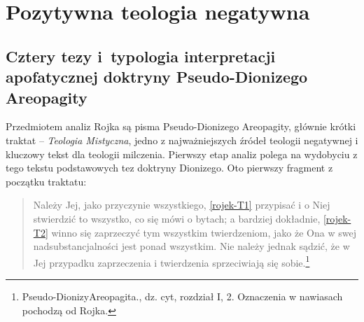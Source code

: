 \chapter{Pozytywna teologia negatywna}


\section{Cztery tezy i~typologia interpretacji apofatycznej doktryny Pseudo-Dionizego Areopagity}

Przedmiotem analiz Rojka są pisma Pseudo-Dionizego Areopagity, głównie
krótki traktat -- \textit{Teologia Mistyczna}, jedno z najważniejszych
źródeł teologii negatywnej i kluczowy tekst dla teologii milczenia.
Pierwszy etap analiz polega na wydobyciu z tego tekstu podstawowych tez
doktryny Dionizego. Oto pierwszy fragment z początku traktatu:

\begin{quote}
    Należy Jej, jako przyczynie wszystkiego, \eqref{rojek-T1} przypisać i o Niej
stwierdzić to wszystko, co się mówi o bytach; a bardziej dokładnie,
\eqref{rojek-T2} winno się zaprzeczyć tym wszystkim twierdzeniom, jako że Ona w
swej nadsubstancjalności jest ponad wszystkim. Nie należy jednak
sądzić, że w Jej przypadku zaprzeczenia i twierdzenia sprzeciwiają się
sobie.\footnote{Pseudo-DionizyAreopagita., dz. cyt, rozdział I, 2.
Oznaczenia w nawiasach pochodzą od Rojka.}
\end{quote}





